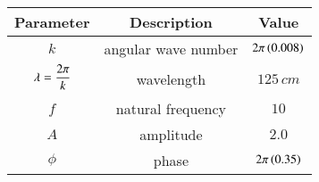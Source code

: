 \begin{tabular}{|c|c|c|}
\hline
\textbf{Parameter}&\textbf{Description} &\textbf{Value}\\
   \hline
   $k$ & angular wave number & $2\pi\left(0.008\right)$ \\
   \hline
   $\lambda=\dfrac{2\pi}{k\vphantom{\brak{0.1}}}$ & wavelength & $125\,cm$ \\
   \hline
   $f$ & natural frequency & $10$\\
   \hline
   $A$ & amplitude & $2.0$\\
   \hline
   $\phi$ & phase &  $2\pi\left(0.35\right)$ \\
   \hline
\end{tabular}

